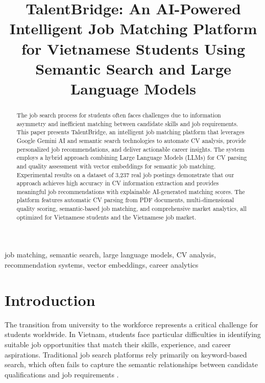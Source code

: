 \documentclass[conference]{IEEEtran}
\begin{document}
\title{TalentBridge: An AI-Powered Intelligent Job Matching Platform for Vietnamese Students Using Semantic Search and Large Language Models}

\author{
}

\maketitle

\begin{abstract}
The job search process for students often faces challenges due to information asymmetry and inefficient matching between candidate skills and job requirements. This paper presents TalentBridge, an intelligent job matching platform that leverages Google Gemini AI and semantic search technologies to automate CV analysis, provide personalized job recommendations, and deliver actionable career insights. The system employs a hybrid approach combining Large Language Models (LLMs) for CV parsing and quality assessment with vector embeddings for semantic job matching. Experimental results on a dataset of 3,237 real job postings demonstrate that our approach achieves high accuracy in CV information extraction and provides meaningful job recommendations with explainable AI-generated matching scores. The platform features automatic CV parsing from PDF documents, multi-dimensional quality scoring, semantic-based job matching, and comprehensive market analytics, all optimized for Vietnamese students and the Vietnamese job market.
\end{abstract}

\begin{IEEEkeywords}
job matching, semantic search, large language models, CV analysis, recommendation systems, vector embeddings, career analytics
\end{IEEEkeywords}

\section{Introduction}

The transition from university to the workforce represents a critical challenge for students worldwide. In Vietnam, students face particular difficulties in identifying suitable job opportunities that match their skills, experience, and career aspirations. Traditional job search platforms rely primarily on keyword-based search, which often fails to capture the semantic relationships between candidate qualifications and job requirements \cite{b1}.
\end{document}
